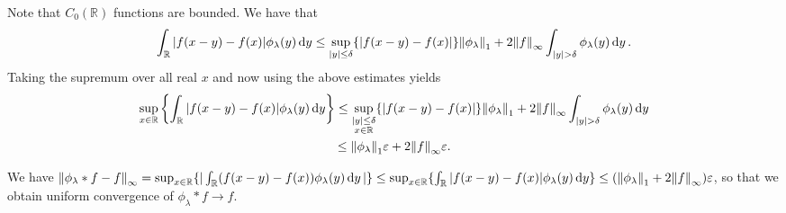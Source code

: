 \documentclass[11pt]{article}
\newcommand{\cbr}[1]{\left\{#1\right\}}
\begin{document}
\begin{enumerate}
    Note that $C_0(\mathbb{R})$ functions are bounded. We have that \[\int_\mathbb{R} \abs{f(x-y)-f(x)}\phi_\lambda(y)\dd{y} \leq \sup_{\abs{y}\leq \delta}\{\abs{f(x-y)-f(x)}\}\norm{\phi_\lambda}_1 + 2\norm{f}_\infty\int_{\abs{y}>\delta}\phi_\lambda(y)\dd{y}.\] Taking the supremum over all real $x$ and now using the above estimates yields \begin{multline*}
      \sup_{x\in\mathbb{R}}\cbr{\int_\mathbb{R} \abs{f(x-y)-f(x)}\phi_\lambda(y)\dd{y}} \leq \sup_{\substack{\abs{y}\leq \delta\\x\in\mathbb{R}}}\{\abs{f(x-y)-f(x)}\}\norm{\phi_\lambda}_1 + 2\norm{f}_\infty\int_{\abs{y}>\delta}\phi_\lambda(y)\dd{y}\\\leq \norm{\phi_\lambda}_1\varepsilon + 2\norm{f}_\infty\varepsilon.
    \end{multline*} 

    We have $\norm{\phi_\lambda\ast f - f}_\infty = \sup_{x\in \mathbb{R}}\{|\int_\mathbb{R} (f(x-y)-f(x))\phi_\lambda(y)\dd{y}|\} \leq \sup_{x\in \mathbb{R}}\{\int_\mathbb{R} |f(x-y)-f(x)|\phi_\lambda(y)\dd{y}\}\leq (\norm{\phi_\lambda}_1 + 2\norm{f}_\infty)\varepsilon$, so that we obtain uniform convergence of $\phi_\lambda\ast f\to f$.
\end{enumerate}
\end{document}
